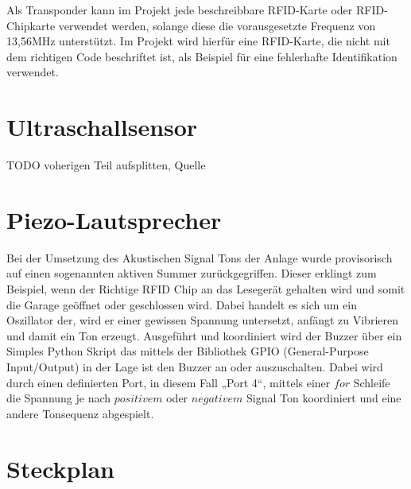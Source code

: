 Als Transponder kann im Projekt jede beschreibbare RFID-Karte oder RFID-Chipkarte verwendet werden, solange diese die vorausgesetzte Frequenz von 13,56MHz unterstützt. Im Projekt wird hierfür eine RFID-Karte, die nicht mit dem richtigen Code beschriftet ist, als Beispiel für eine fehlerhafte Identifikation verwendet. 

\section{Ultraschallsensor}
TODO voherigen Teil aufsplitten, Quelle

\section{Piezo-Lautsprecher}
Bei der Umsetzung des Akustischen Signal Tons der Anlage wurde provisorisch auf einen sogenannten aktiven Summer zurückgegriffen. Dieser erklingt zum Beispiel, wenn der Richtige RFID Chip an das Lesegerät gehalten wird und somit die Garage geöffnet oder geschlossen wird. Dabei handelt es sich um ein Oszillator der, wird er einer gewissen Spannung untersetzt, anfängt zu Vibrieren und damit ein Ton erzeugt. Ausgeführt und koordiniert wird der Buzzer über ein Simples Python Skript das mittels der Bibliothek GPIO (General-Purpose Input/Output) in der Lage ist den Buzzer an oder auszuschalten. Dabei wird durch einen definierten Port, in diesem Fall „Port 4“, mittels einer $for$ Schleife die Spannung je nach $positivem$ oder $negativem$ Signal Ton koordiniert und eine andere Tonsequenz abgespielt. 


\section{Steckplan}

